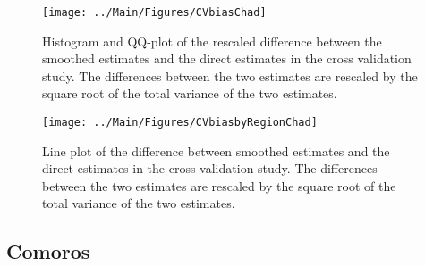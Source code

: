\documentclass[12pt]{article}\usepackage[]{graphicx}\usepackage[]{color}
\newenvironment{knitrout}{}{} %
\begin{document}
\begin{knitrout}
\color{fgcolor}\begin{figure}[bht]

{\centering \texttt{[image: ../Main/Figures/CVbiasChad]} 

}

\caption[Histogram and QQ-plot of the rescaled difference between the smoothed estimates and the direct estimates in the cross validation study]{Histogram and QQ-plot of the rescaled difference between the smoothed estimates and the direct estimates in the cross validation study. The differences between the two estimates are rescaled by the square root of the total variance of the two estimates.}\label{fig:unnamed-chunk-59}
\end{figure}


\end{knitrout}

\begin{knitrout}
\color{fgcolor}\begin{figure}[bht]

{\centering \texttt{[image: ../Main/Figures/CVbiasbyRegionChad]} 

}

\caption[Line plot of the difference between smoothed estimates and the direct estimates in the cross validation study]{Line plot of the difference between smoothed estimates and the direct estimates in the cross validation study. The differences between the two estimates are rescaled by the square root of the total variance of the two estimates.}\label{fig:unnamed-chunk-60}
\end{figure}


\end{knitrout}

\clearpage
\subsection{Comoros}


\end{document}
